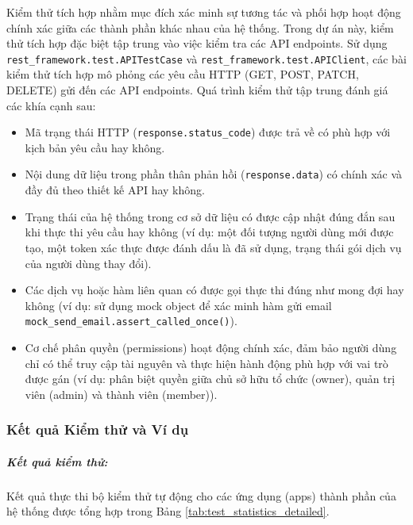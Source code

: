 Kiểm thử tích hợp nhằm mục đích xác minh sự tương tác và phối hợp hoạt động chính xác giữa các thành phần khác nhau của hệ thống. Trong dự án này, kiểm thử tích hợp đặc biệt tập trung vào việc kiểm tra các API endpoints. Sử dụng \texttt{rest\_framework.test.APITestCase} và \texttt{rest\_framework.test.APIClient}, các bài kiểm thử tích hợp mô phỏng các yêu cầu HTTP (GET, POST, PATCH, DELETE) gửi đến các API endpoints. Quá trình kiểm thử tập trung đánh giá các khía cạnh sau:
\begin{itemize}
    \item Mã trạng thái HTTP (\texttt{response.status\_code}) được trả về có phù hợp với kịch bản yêu cầu hay không.
    \item Nội dung dữ liệu trong phần thân phản hồi (\texttt{response.data}) có chính xác và đầy đủ theo thiết kế API hay không.
    \item Trạng thái của hệ thống trong cơ sở dữ liệu có được cập nhật đúng đắn sau khi thực thi yêu cầu hay không (ví dụ: một đối tượng người dùng mới được tạo, một token xác thực được đánh dấu là đã sử dụng, trạng thái gói dịch vụ của người dùng thay đổi).
    \item Các dịch vụ hoặc hàm liên quan có được gọi thực thi đúng như mong đợi hay không (ví dụ: sử dụng mock object để xác minh hàm gửi email \texttt{mock\_send\_email.assert\_called\_once()}).
    \item Cơ chế phân quyền (permissions) hoạt động chính xác, đảm bảo người dùng chỉ có thể truy cập tài nguyên và thực hiện hành động phù hợp với vai trò được gán (ví dụ: phân biệt quyền giữa chủ sở hữu tổ chức (owner), quản trị viên (admin) và thành viên (member)).
\end{itemize}

\subsubsection{Kết quả Kiểm thử và Ví dụ} 

\subparagraph{Kết quả kiểm thử: }


Kết quả thực thi bộ kiểm thử tự động cho các ứng dụng (apps) thành phần của hệ thống được tổng hợp trong Bảng \ref{tab:test_statistics_detailed}.

